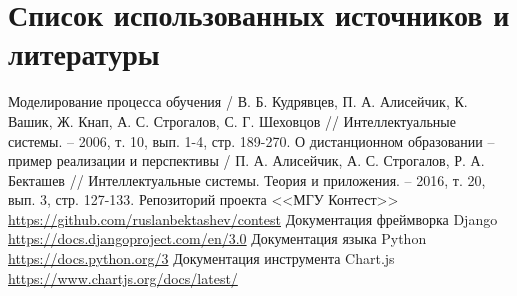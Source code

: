 \documentclass[12pt, a4paper, oneside]{article}
\begin{document}
\section{Список использованных источников и литературы}
\begingroup
\renewcommand{\section}[2]{}
\begin{thebibliography}{20}
    Моделирование процесса обучения / В. Б. Кудрявцев, П. А. Алисейчик, К. Вашик, Ж. Кнап, А. С. Строгалов, С. Г. Шеховцов // Интеллектуальные системы. – 2006, т. 10, вып. 1-4, стр. 189-270.
    О дистанционном образовании – пример реализации и перспективы / П. А. Алисейчик, А. С. Строгалов, Р. А. Бекташев // Интеллектуальные системы. Теория и приложения. – 2016, т. 20, вып. 3, стр. 127-133.
    Репозиторий проекта <<МГУ Контест>>\\
    \url{https://github.com/ruslanbektashev/contest}
    Документация фреймворка Django\\
    \url{https://docs.djangoproject.com/en/3.0}
    Документация языка Python\\
    \url{https://docs.python.org/3}
    Документация инструмента Chart.js\\
    \url{https://www.chartjs.org/docs/latest/}
\end{thebibliography}
\endgroup
\end{document}

